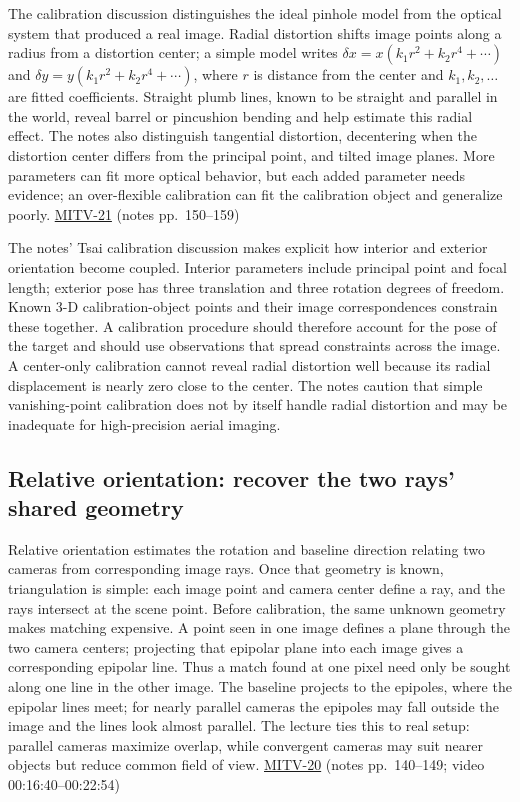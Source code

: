 The calibration discussion distinguishes the ideal pinhole model from the optical system that produced a real image. Radial distortion shifts image points along a radius from a distortion center; a simple model writes \(\delta x=x(k_1r^2+k_2r^4+\cdots)\) and \(\delta y=y(k_1r^2+k_2r^4+\cdots)\), where \(r\) is distance from the center and \(k_1,k_2,\ldots\) are fitted coefficients. Straight plumb lines, known to be straight and parallel in the world, reveal barrel or pincushion bending and help estimate this radial effect. The notes also distinguish tangential distortion, decentering when the distortion center differs from the principal point, and tilted image planes. More parameters can fit more optical behavior, but each added parameter needs evidence; an over-flexible calibration can fit the calibration object and generalize poorly. \hyperref[04-visual-computing-ii-ch036-mitv-21---relative-orientation-binocular-stereo-structure-quadrics-calibration-reprojection]{MITV-21} (notes pp.~150--159)

The notes' Tsai calibration discussion makes explicit how interior and exterior orientation become coupled. Interior parameters include principal point and focal length; exterior pose has three translation and three rotation degrees of freedom. Known 3-D calibration-object points and their image correspondences constrain these together. A calibration procedure should therefore account for the pose of the target and should use observations that spread constraints across the image. A center-only calibration cannot reveal radial distortion well because its radial displacement is nearly zero close to the center. The notes caution that simple vanishing-point calibration does not by itself handle radial distortion and may be inadequate for high-precision aerial imaging.

\subsection{Relative orientation: recover the two rays' shared geometry}\label{04-visual-computing-ii-ch032-relative-orientation-recover-the-two-rays-shared-geometry}

Relative orientation estimates the rotation and baseline direction relating two cameras from corresponding image rays. Once that geometry is known, triangulation is simple: each image point and camera center define a ray, and the rays intersect at the scene point. Before calibration, the same unknown geometry makes matching expensive. A point seen in one image defines a plane through the two camera centers; projecting that epipolar plane into each image gives a corresponding epipolar line. Thus a match found at one pixel need only be sought along one line in the other image. The baseline projects to the epipoles, where the epipolar lines meet; for nearly parallel cameras the epipoles may fall outside the image and the lines look almost parallel. The lecture ties this to real setup: parallel cameras maximize overlap, while convergent cameras may suit nearer objects but reduce common field of view. \hyperref[04-visual-computing-ii-ch036-mitv-20---space-of-rotations-regular-tessellations-critical-surfaces-binocular-stereo]{MITV-20} (notes pp.~140--149; video 00:16:40--00:22:54)

